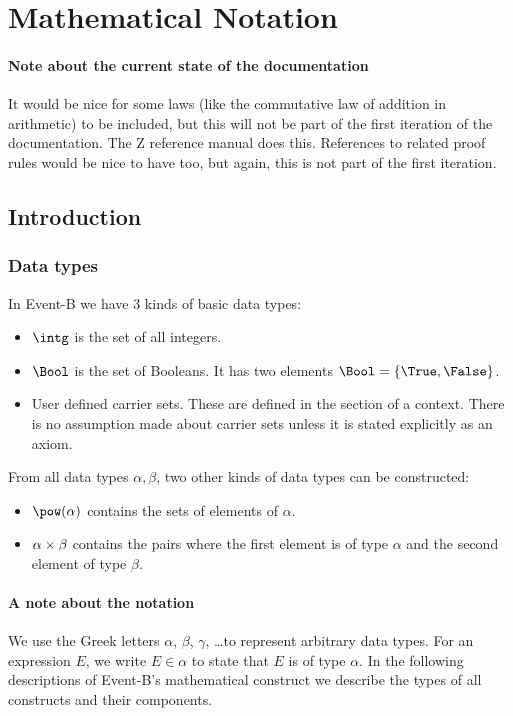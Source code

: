 \section{Mathematical Notation}
\label{mathematical_notation}

\paragraph{Note about the current state of the documentation}
It would be nice for some laws (like the commutative law of addition in arithmetic) to be included, but this will not be part of the first iteration of the documentation. The Z reference manual does this.
References to related proof rules would be nice to have too, but again, this is not part of the first iteration.

\subsection{Introduction}

\subsubsection{Data types}
\label{data_types}

In Event-B we have 3 kinds of basic data types:
\begin{itemize}
\item $\intg$ is the set of all integers.
\item {}
  $\Bool$ is the set of Booleans. 
  It has two elements $\Bool = \{\True,\False\}$.
\item User defined carrier sets. 
  These are defined in the  section of a context.
  There is no assumption made about carrier sets unless it is stated explicitly as
  an axiom.
\end{itemize}
From all data types $\alpha, \beta$, two other kinds of data types can be constructed:
\begin{itemize}
\item $\pow(\alpha)$ contains the sets of elements of $\alpha$.
\item $\alpha\mathbin\times\beta$ contains the pairs where the first element is of type $\alpha$ and the
  second element of type $\beta$.
\end{itemize}
\paragraph{A note about the notation}
We use the Greek letters $\alpha$, $\beta$, $\gamma$, \ldots to represent arbitrary data types.
For an expression $E$, we write $E\in\alpha$ to state that $E$ is of type $\alpha$.
In the following descriptions of Event-B's mathematical construct we describe the
  types of all constructs and their components.

